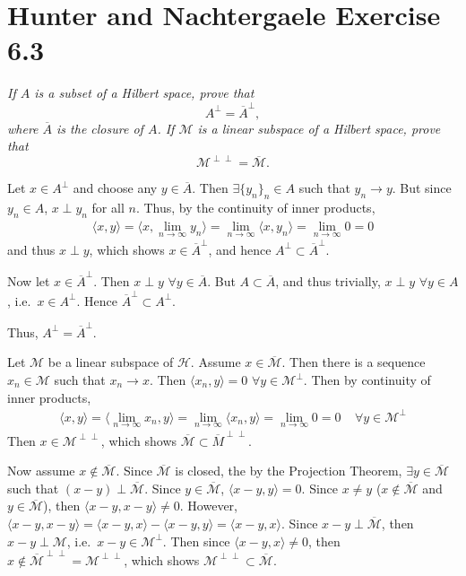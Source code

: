 \documentclass[12pt]{article}
\theoremstyle{plain}
\begin{document}
\section*{Hunter and Nachtergaele Exercise 6.3}
\emph{If $A$ is a subset of a Hilbert space, prove that $$A^\perp = \overline{A}^\perp,$$ where $\overline{A}$ is the closure of $A$.  If $\mathcal{M}$ is a linear subspace of a Hilbert space, prove that $$\mathcal{M}^{\perp\perp} = \overline{\mathcal{M}}.$$}

Let $x \in A^\perp$ and choose any $y \in \overline{A}$.  Then $\exists \{y_n\}_n \in A$ such that $y_n \rightarrow y$.  But since $y_n \in A$, $x\perp y_n$ for all $n$.  Thus, by the continuity of inner products,
\begin{align*}
    \langle x, y \rangle = \langle x, \lim_{n\rightarrow \infty} y_n \rangle = \lim_{n\rightarrow\infty} \langle x, y_n \rangle = \lim_{n\rightarrow \infty} 0 = 0
\end{align*}
and thus $x \perp y$, which shows $x \in \overline{A}^\perp$, and hence $A^\perp \subset \overline{A}^\perp$.

Now let $x \in \overline{A}^\perp$.  Then $x \perp y$ $\forall y \in \overline{A}$.  But $A \subset \overline{A}$, and thus trivially, $x \perp y$ $\forall y \in A$, i.e.~$x \in A^\perp$.  Hence $\overline{A}^\perp \subset A^\perp$.

Thus, $A^\perp = \overline{A}^\perp$.

Let $\mathcal{M}$ be a linear subspace of $\mathcal{H}$.  Assume $x \in \overline{\mathcal{M}}$.  Then there is a sequence $x_n \in \mathcal{M}$ such that $x_n \rightarrow x$.  Then $\langle x_n, y \rangle = 0$ $\forall y \in \mathcal{M}^\perp$.  Then by continuity of inner products,
\begin{align*}
    \langle x, y \rangle = \langle \lim_{n\rightarrow \infty} x_n, y \rangle = \lim_{n\rightarrow \infty} \langle x_n, y \rangle = \lim_{n\rightarrow \infty} 0 = 0\ \ \ \ \ \forall y \in \mathcal{M}^\perp
\end{align*}
Then $x \in \mathcal{M}^{\perp\perp}$, which shows $\overline{\mathcal{M}} \subset \overline{M}^{\perp\perp}$.

Now assume $x \not\in \overline{\mathcal{M}}$.  Since $\overline{\mathcal{M}}$ is closed, the by the Projection Theorem, $\exists y \in \overline{\mathcal{M}}$ such that $(x - y) \perp \overline{\mathcal{M}}$.  Since $y \in \overline{\mathcal{M}}$, $\langle x - y, y \rangle = 0$.  Since $x \neq y$ ($x \not\in \overline{\mathcal{M}}$ and $y \in \overline{\mathcal{M}}$), then $\langle x - y, x - y \rangle \neq 0$.  However, $\langle x - y, x - y \rangle = \langle x - y, x\rangle - \langle x - y, y \rangle = \langle x - y, x \rangle$.  Since $x - y \perp \overline{\mathcal{M}}$, then $x - y \perp \mathcal{M}$, i.e.~$x - y \in \mathcal{M}^\perp$.  Then since $\langle x - y, x \rangle \neq 0$, then $x \not\in \overline{\mathcal{M}}^{\perp\perp} = \mathcal{M}^{\perp\perp}$, which shows $\mathcal{M}^{\perp\perp} \subset \overline{\mathcal{M}}$.
\end{document}
